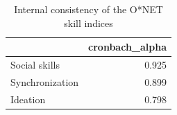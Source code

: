 \begin{table}
\caption{Internal consistency of the O*NET skill indices}
\label{tab:table_s0_index_reliability}
\begin{tabular}{lr}
\toprule
 & cronbach\_alpha \\
\midrule
Social skills & 0.925 \\
Synchronization & 0.899 \\
Ideation & 0.798 \\
\bottomrule
\end{tabular}
\end{table}
